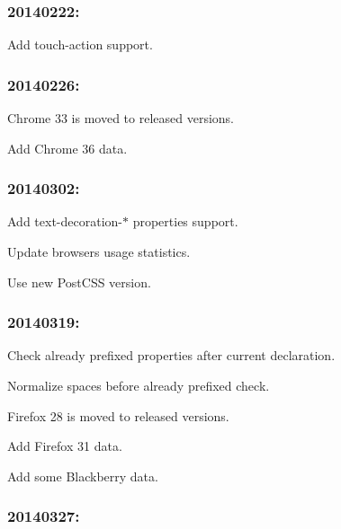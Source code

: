 \subsubsection*{20140222\+:}


\begin{DoxyItemize}
\item Add {\ttfamily touch-\/action} support.
\end{DoxyItemize}

\subsubsection*{20140226\+:}


\begin{DoxyItemize}
\item Chrome 33 is moved to released versions.
\item Add Chrome 36 data.
\end{DoxyItemize}

\subsubsection*{20140302\+:}


\begin{DoxyItemize}
\item Add {\ttfamily text-\/decoration-\/$\ast$} properties support.
\item Update browsers usage statistics.
\item Use new Post\+C\+SS version.
\end{DoxyItemize}

\subsubsection*{20140319\+:}


\begin{DoxyItemize}
\item Check already prefixed properties after current declaration.
\item Normalize spaces before already prefixed check.
\item Firefox 28 is moved to released versions.
\item Add Firefox 31 data.
\item Add some Blackberry data.
\end{DoxyItemize}

\subsubsection*{20140327\+:}


